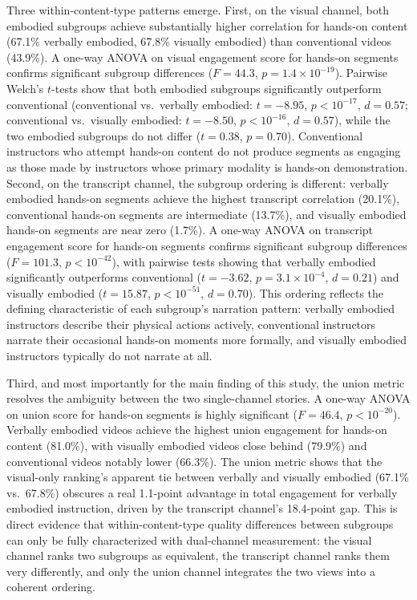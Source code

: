 \documentclass[fleqn,10pt]{wlscirep}
\begin{document}
Three within-content-type patterns emerge. First, on the visual channel, both embodied subgroups achieve substantially higher correlation for hands-on content (67.1\% verbally embodied, 67.8\% visually embodied) than conventional videos (43.9\%). A one-way ANOVA on visual engagement score for hands-on segments confirms significant subgroup differences ($F = 44.3$, $p = 1.4 \times 10^{-19}$). Pairwise Welch's $t$-tests show that both embodied subgroups significantly outperform conventional (conventional vs.\ verbally embodied: $t = -8.95$, $p < 10^{-17}$, $d = 0.57$; conventional vs.\ visually embodied: $t = -8.50$, $p < 10^{-16}$, $d = 0.57$), while the two embodied subgroups do not differ ($t = 0.38$, $p = 0.70$). Conventional instructors who attempt hands-on content do not produce segments as engaging as those made by instructors whose primary modality is hands-on demonstration. Second, on the transcript channel, the subgroup ordering is different: verbally embodied hands-on segments achieve the highest transcript correlation (20.1\%), conventional hands-on segments are intermediate (13.7\%), and visually embodied hands-on segments are near zero (1.7\%). A one-way ANOVA on transcript engagement score for hands-on segments confirms significant subgroup differences ($F = 101.3$, $p < 10^{-42}$), with pairwise tests showing that verbally embodied significantly outperforms conventional ($t = -3.62$, $p = 3.1 \times 10^{-4}$, $d = 0.21$) and visually embodied ($t = 15.87$, $p < 10^{-51}$, $d = 0.70$). This ordering reflects the defining characteristic of each subgroup's narration pattern: verbally embodied instructors describe their physical actions actively, conventional instructors narrate their occasional hands-on moments more formally, and visually embodied instructors typically do not narrate at all.

Third, and most importantly for the main finding of this study, the union metric resolves the ambiguity between the two single-channel stories. A one-way ANOVA on union score for hands-on segments is highly significant ($F = 46.4$, $p < 10^{-20}$). Verbally embodied videos achieve the highest union engagement for hands-on content (81.0\%), with visually embodied videos close behind (79.9\%) and conventional videos notably lower (66.3\%). The union metric shows that the visual-only ranking's apparent tie between verbally and visually embodied (67.1\% vs.\ 67.8\%) obscures a real 1.1-point advantage in total engagement for verbally embodied instruction, driven by the transcript channel's 18.4-point gap. This is direct evidence that within-content-type quality differences between subgroups can only be fully characterized with dual-channel measurement: the visual channel ranks two subgroups as equivalent, the transcript channel ranks them very differently, and only the union channel integrates the two views into a coherent ordering.
\end{document}
